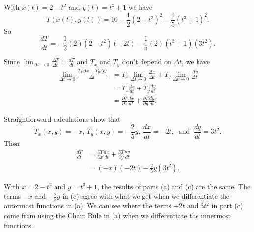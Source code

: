\begin{activitySolution} 
  \ba
\item With $x(t) = 2-t^2$ and $y(t) = t^3+1$ we have 
\[T(x(t),y(t)) = 10-\frac{1}{2}\left(2-t^2\right)^2-\frac{1}{5}\left(t^3+1\right)^2.\]
So 
\[\frac{dT}{dt} = -\frac{1}{2}(2)\left(2-t^2\right)(-2t)-\frac{1}{5}(2)\left(t^3+1\right)(3t^2).\]

\item Since $\lim_{\Delta t \to 0} \frac{\Delta T}{\Delta t} = \frac{dT}{dt}$ and $T_x$ and $T_y$ don't depend on $\Delta t$, we have 
\begin{align*}
\lim_{\Delta t \to 0} \frac{T_x \Delta x + T_y \Delta y}{\Delta t} &= T_x \lim_{\Delta t \to 0} \frac{\Delta x}{\Delta t} + T_y  \lim_{\Delta t \to 0} \frac{\Delta y}{\Delta t} \\
	&= T_x \frac{dx}{dt} + T_y \frac{dy}{dt} \\
	&= \frac{\partial T}{\partial x} \frac{dx}{dt} + \frac{\partial T}{\partial y} \frac{dy}{dt}.
\end{align*}

	\item  Straightforward calculations show that 
\[T_x(x,y) = -x, \ T_y(x,y) = -\frac{2}{5}y, \ \frac{dx}{dt} = -2t, \ \text{ and } \ \frac{dy}{dt} = 3t^2.\]
Then
\begin{align*}
\frac{dT}{dt} &= \frac{\partial T}{\partial x} \frac{dx}{dt} + \frac{\partial T}{\partial y} \frac{dy}{dt} \\
	&= (-x)(-2t) - \frac{2}{5}y(3t^2).
\end{align*}
	
	\item With $x=2-t^2$ and $y = t^3+1$, the results of parts (a) and (c) are the same. The terms $-x$ and $-\frac{2}{5}y$ in (c) agree with what we get when we differentiate the outermost functions in (a). We can see where the terms $-2t$ and $3t^2$ in part (c) come from using the Chain Rule in (a) when we differentiate the innermost functions. 
  \ea
\end{activitySolution}

\afterpa 